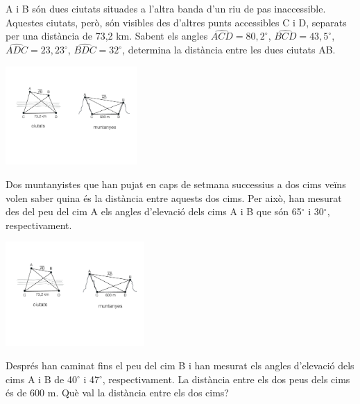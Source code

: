 \begin{mylist}
	\exer[-1]
	\begin{minipage}[t]{0.55\textwidth}
		\spicy  A i B són dues ciutats situades a l'altra banda d'un riu de pas 
		inaccessible. Aquestes ciutats, però, són visibles des d'altres punts accessibles
		C i D, separats per una distància de 73,2 km. Sabent els angles
		$\widehat{ACD}=80,2^\circ$, $\widehat{BCD}=43,5^\circ$, $\widehat{ADC}=23,23^\circ$, $\widehat{BDC}=32^\circ$, determina la distància entre les dues ciutats AB.
	\end{minipage}\hfill
	\begin{minipage}[t]{5.5cm}
		\vspace{-\baselineskip}
		\includegraphics[width=5cm]{img-03/ciutats}
	\end{minipage}
	
	\exer[1]
	\begin{minipage}[t]{0.55\textwidth}
		\spicy Dos muntanyistes que han pujat en caps de setmana successius a dos cims veïns volen saber quina és la
		distància entre aquests dos cims. Per això, han mesurat des del peu del cim A els angles d'elevació dels cims A i B que són 65${}^\circ$ i 30${}^\circ$, respectivament. 
	\end{minipage}\hfill
	\begin{minipage}[t]{5.5cm}
		\vspace{-\baselineskip}
		\includegraphics[width=5.3cm]{img-03/muntanyes}
	\end{minipage}
	
	Després han caminat fins el peu del cim B i han mesurat els angles d'elevació dels cims A i B de 40${}^\circ$ i 47${}^\circ$, respectivament. La distància entre els dos peus dels cims és de 600 m. Què val la distància entre els dos cims?


\end{mylist}
